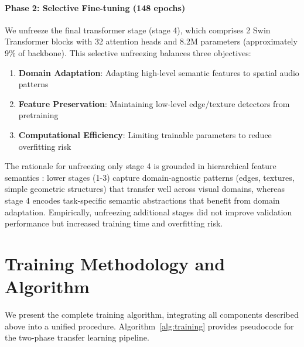 \documentclass[11pt,a4paper]{article}
\begin{document}
\paragraph{Phase 2: Selective Fine-tuning (148 epochs)} We unfreeze the final transformer stage (stage 4), which comprises 2 Swin Transformer blocks with 32 attention heads and 8.2M parameters (approximately 9\% of backbone). This selective unfreezing balances three objectives:
\begin{enumerate}[leftmargin=*]
\item \textbf{Domain Adaptation}: Adapting high-level semantic features to spatial audio patterns
\item \textbf{Feature Preservation}: Maintaining low-level edge/texture detectors from pretraining
\item \textbf{Computational Efficiency}: Limiting trainable parameters to reduce overfitting risk
\end{enumerate}

The rationale for unfreezing only stage 4 is grounded in hierarchical feature semantics \cite{liu2021swin}: lower stages (1-3) capture domain-agnostic patterns (edges, textures, simple geometric structures) that transfer well across visual domains, whereas stage 4 encodes task-specific semantic abstractions that benefit from domain adaptation. Empirically, unfreezing additional stages did not improve validation performance but increased training time and overfitting risk.

\section{Training Methodology and Algorithm}
\label{sec:training_algorithm}

We present the complete training algorithm, integrating all components described above into a unified procedure. Algorithm~\ref{alg:training} provides pseudocode for the two-phase transfer learning pipeline.
\end{document}

